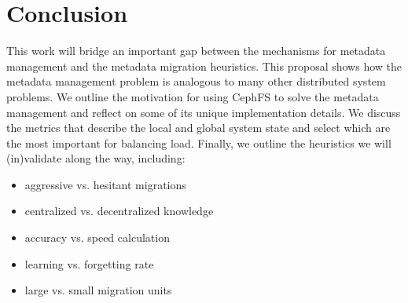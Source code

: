 \chapter{Conclusion}
This work will bridge an important gap between the mechanisms for metadata management and the metadata migration heuristics. This proposal shows how the metadata management problem is analogous to many other distributed system problems. We outline the motivation for using CephFS to solve the metadata management and reflect on some of its unique implementation details. We discuss the metrics that describe the local and global system state and select which are the most important for balancing load. Finally, we outline the heuristics we will (in)validate along the way, including: 
\begin{itemize}
	\item aggressive vs. hesitant migrations
	\item centralized vs. decentralized knowledge
	\item accuracy vs. speed calculation
	\item learning vs. forgetting rate
	\item large vs. small migration units
\end{itemize}